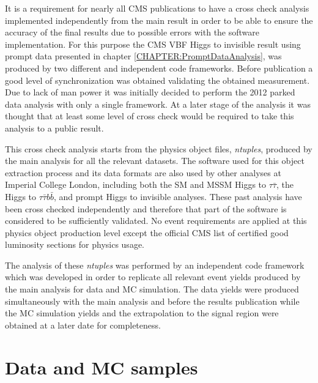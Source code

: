 It is a requirement for nearly all \gls{CMS} publications to have a cross check analysis implemented independently from the main result in order to be able to ensure the accuracy of the final results due to possible errors with the software implementation. For this purpose the \gls{CMS} \gls{VBF} Higgs to invisible result using prompt data presented in chapter \ref{CHAPTER:PromptDataAnalysis}, was produced by two different and independent code frameworks. Before publication a good level of synchronization was obtained validating the obtained measurement. Due to lack of man power it was initially decided to perform the 2012 parked data analysis with only a single framework. At a later stage of the analysis it was thought that at least some level of cross check would be required to take this analysis to a public result.
 
This cross check analysis starts from the physics object files, \textit{ntuples}, produced by the main analysis for all the relevant datasets. The software used for this object extraction process and its data formats are also used by other analyses at Imperial College London, including both the \gls{SM} and \gls{MSSM} Higgs to $\tau\bar{\tau}$, the Higgs to $\tau\bar{\tau}b\bar{b}$, and prompt Higgs to invisible analyses. These past analysis have been cross checked independently and therefore that part of the software is considered to be sufficiently validated. No event requirements are applied at this physics object production level except the official \gls{CMS} list of certified good luminosity sections for physics usage.
 
The analysis of these \textit{ntuples} was performed by an independent code framework which was developed in order to replicate all relevant event yields produced by the main analysis for data and \gls{MC} simulation. The data yields were produced simultaneously with the main analysis and before the results publication while the \gls{MC} simulation yields and the extrapolation to the signal region were obtained at a later date for completeness. 

\section{Data and MC samples}


